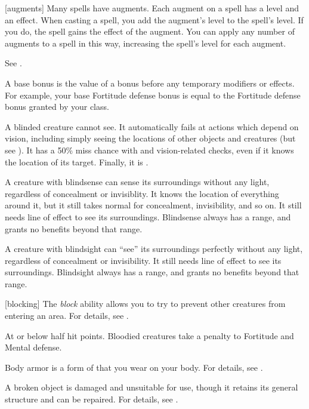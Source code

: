 [augments] Many spells have augments.
Each augment on a spell has a level and an effect.
When casting a spell, you add the augment's level to the spell's level.
If you do, the spell gains the effect of the augment.
You can apply any number of augments to a spell in this way, increasing the spell's level for each augment.

 See .

 A base bonus is the value of a bonus before any temporary modifiers or effects. For example, your base Fortitude defense bonus is equal to the Fortitude defense bonus granted by your class.

 A blinded creature cannot see. It automatically fails at actions which depend on vision, including simply seeing the locations of other objects and creatures (but see ). It has a 50\% miss chance with  and vision-related checks, even if it knows the location of its target. Finally, it is .

 A creature with blindsense can sense its surroundings without any light, regardless of concealment or invisiblity.
It knows the location of everything around it, but it still takes normal  for concealment, invisibility, and so on.
It still needs line of effect to see its surroundings.
Blindsense always has a range, and grants no benefits beyond that range.

 A creature with blindsight can ``see'' its surroundings perfectly without any light, regardless of concealment or invisibility.
It still needs line of effect to see its surroundings.
Blindsight always has a range, and grants no benefits beyond that range.

[blocking] The \textit{block} ability allows you to try to prevent other creatures from entering an area.
For details, see .

 At or below half hit points. Bloodied creatures take a  penalty to Fortitude and Mental defense.

 Body armor is a form of  that you wear on your body.
For details, see .

 A broken object is damaged and unsuitable for use, though it retains its general structure and can be repaired.
For details, see .

